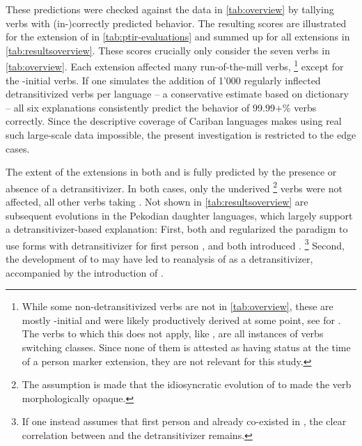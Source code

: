 These predictions were checked against the data in \cref{tab:overview} by tallying verbs with (in-)correctly predicted behavior.
The resulting scores are illustrated for the extension of \PTir {} in \cref{tab:ptir-evaluations} and summed up for all extensions in \cref{tab:resultsoverview}.
These scores crucially only consider the seven verbs in \cref{tab:overview}.
Each extension affected many run-of-the-mill  verbs,%
\footnote{
While some non-detransitivized  verbs \parencites[252]{triomeira1999}[222]{meira2000split}[30]{gildea2007greenberg} are not in \cref{tab:overview}, these are mostly -initial and were likely productively derived at some point, see \textcite[252]{triomeira1999} for \trio.
The verbs to which this does not apply, like \trio {}  \parencites[252]{triomeira1999}, are all instances of  verbs switching classes.
Since none of them is attested as having  status at the time of a person marker extension, they are not relevant for this study.}
except for the \akuriyo {}-initial verbs.
If one simulates the addition of 1'000 regularly inflected detransitivized  verbs per language -- a conservative estimate based on  \kalina dictionary -- all six explanations consistently predict the behavior of 99.99+\% verbs correctly.
Since the descriptive coverage of Cariban languages makes using real such large-scale data impossible, the present investigation is restricted to the edge cases.




The extent of the extensions in both \PWai and \PPek is fully predicted by the presence or absence of a detransitivizer.
In both cases, only the underived%
\footnote{The assumption is made that the idiosyncratic evolution of   to  \PPek made the verb morphologically opaque.}
 verbs were not affected, all other  verbs taking .
Not shown in \cref{tab:resultsoverview} are subsequent evolutions in the Pekodian daughter languages, which largely support a detransitivizer-based explanation:
First, both \ikpeng and \bakairi regularized the paradigm to use forms with detransitivizer for first person , and both introduced .%
\footnote{If one instead assumes that first person  and  already co-existed in \PPek, the clear correlation between  and the detransitivizer remains.}
Second, the development of \PPek {}  to \ikpeng {} may have led to reanalysis of  as a detransitivizer, accompanied by the introduction of .

